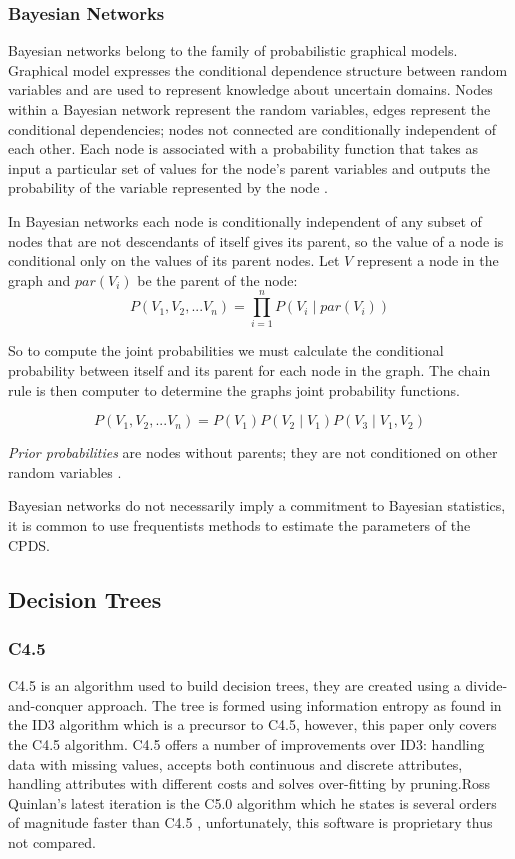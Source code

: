 \documentclass{cmppgr}
\begin{document}
\subsubsection{Bayesian Networks}
Bayesian networks belong to the family of probabilistic graphical models. Graphical model expresses the conditional dependence structure between random variables and are used to represent knowledge about uncertain domains. Nodes within a Bayesian network represent the random variables, edges represent the conditional dependencies; nodes not connected are conditionally independent of each other. Each node is associated with a probability function that takes as input a particular set of values for the node's parent variables and outputs the probability of the variable represented by the node \cite{heckerman1995learning}.

In Bayesian networks each node is conditionally independent of any subset of nodes that are not descendants of itself gives its parent, so the value of a node is conditional only on the values of its parent nodes. Let $V$ represent a node in the graph and $par(V_i)$ be the parent of the node:
$$P(V_1, V_2, ... V_n) = \prod_{i=1}^{n}P(V_i \mid par(V_i))$$

So to compute the joint probabilities we must calculate the conditional probability between itself and its parent for each node in the graph. The chain rule is then computer to determine the graphs joint probability functions. 

$$P(V_1, V_2, ... V_n) = P(V_1)P(V_2 \mid V_1)P(V_3 \mid V_1, V_2)$$


\textit{Prior probabilities} are nodes without parents; they are not conditioned on other random variables \cite{jensen1996introduction}.


Bayesian networks do not necessarily imply a commitment to Bayesian statistics, it is common to use frequentists methods to estimate the parameters of the CPDS.


\subsection{Decision Trees}
\subsubsection{C4.5}
C4.5 is an algorithm used to build decision trees, they are created using a divide-and-conquer approach. The tree is formed using information entropy as found in the ID3 algorithm which is a precursor to C4.5, however, this paper only covers the C4.5 algorithm. C4.5 offers a number of improvements over ID3: handling data with missing values, accepts both continuous and discrete attributes, handling attributes with different costs and solves over-fitting by pruning.Ross Quinlan's latest iteration is the C5.0 algorithm which he states is several orders of magnitude faster than C4.5 \cite{quinlan2004data}, unfortunately, this software is proprietary thus not compared.
\end{document}
